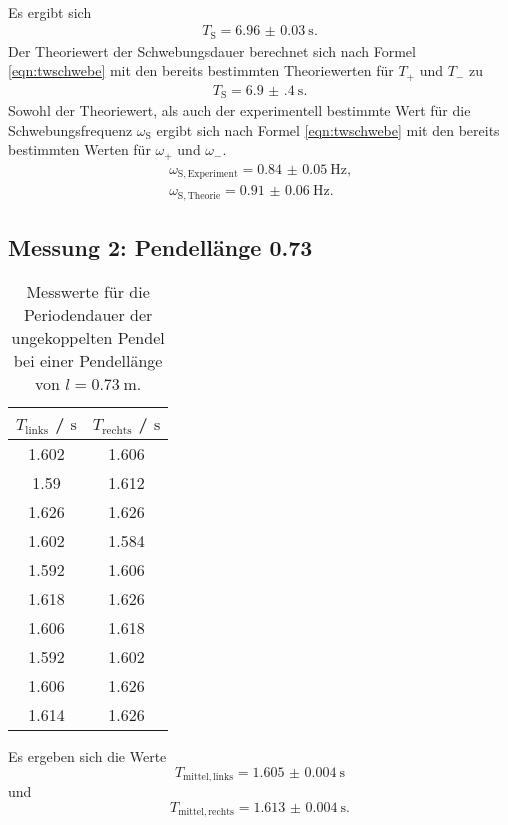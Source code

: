 \\Es ergibt sich
\begin{align*}
	T_{\mathrm{S}}=\SI{6.96(3)}{\second}\text{.}
\end{align*}
Der Theoriewert der Schwebungsdauer berechnet sich nach Formel \eqref{eqn:twschwebe} mit den bereits bestimmten Theoriewerten für $T_{\mathrm{+}}$ und $T_{\mathrm{-}}$ zu
\begin{align*}
	T_{\mathrm{S}}=\SI{6.9(4)}{\second}\text{.}
\end{align*}
Sowohl der Theoriewert, als auch der experimentell bestimmte Wert für die Schwebungsfrequenz $\omega_{\mathrm{S}}$ ergibt sich nach Formel \eqref{eqn:twschwebe} mit den bereits bestimmten Werten für $\omega_{\mathrm{+}}$ und $\omega_{\mathrm{-}}$.
\begin{align*}
	\omega_{\mathrm{S,Experiment}}=\SI{0.84(5)}{\Hz}\text{,} \\
	\omega_{\mathrm{S,Theorie}}=\SI{0.91(6)}{\Hz}\text{.}
\end{align*}






\FloatBarrier
\subsection{Messung 2: Pendellänge 0.73}

\begin{table}
	\centering
	\caption{Messwerte für die Periodendauer der ungekoppelten Pendel bei einer Pendellänge von $l=\SI{0.73}{\meter}$.}
	\label{tab:rivaldo}
	\begin{tabular}{cc}
		\toprule
		$T_{\mathrm{links}}$ / $ \si{\second}$ & $T_{\mathrm{rechts}}$ / $\si{\second}$\\
		\midrule
		1.602 & 1.606 \\
		1.59 & 1.612 \\
		1.626 & 1.626 \\
		1.602 & 1.584 \\
		1.592 & 1.606 \\
		1.618 & 1.626 \\
		1.606 & 1.618 \\
		1.592 & 1.602 \\
		1.606 & 1.626 \\
		1.614 & 1.626 \\
		\bottomrule
	\end{tabular}
\end{table}

Es ergeben sich die Werte 
\begin{equation*}
	T_{\mathrm{mittel,links}} = \SI{1.605(4)}{\second}
\end{equation*}
und
\begin{equation*}
	T_{\mathrm{mittel,rechts}} = \SI{1.613(4)}{\second} \mathrm{.}
\end{equation*}

